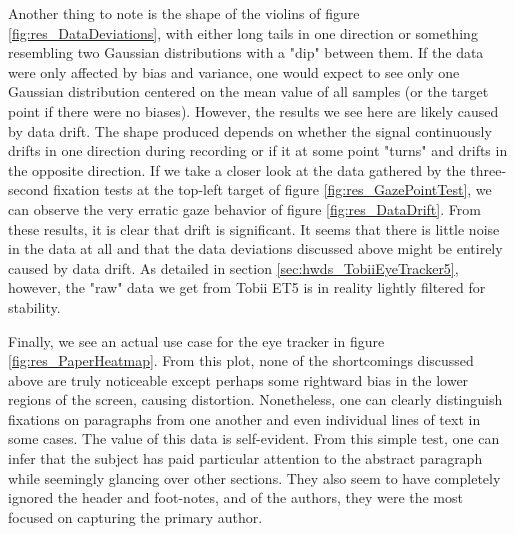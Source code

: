 Another thing to note is the shape of the violins of figure \ref{fig:res_DataDeviations}, with either long tails in one direction or something resembling two Gaussian distributions with a "dip" between them. If the data were only affected by bias and variance, one would expect to see only one Gaussian distribution centered on the mean value of all samples (or the target point if there were no biases). However, the results we see here are likely caused by data drift. The shape produced depends on whether the signal continuously drifts in one direction during recording or if it at some point "turns" and drifts in the opposite direction. If we take a closer look at the data gathered by the three-second fixation tests at the top-left target of figure \ref{fig:res_GazePointTest}, we can observe the very erratic gaze behavior of figure \ref{fig:res_DataDrift}. From these results, it is clear that drift is significant. It seems that there is little noise in the data at all and that the data deviations discussed above might be entirely caused by data drift. As detailed in section \ref{sec:hwds_TobiiEyeTracker5}, however, the "raw" data we get from Tobii ET5 is in reality lightly filtered for stability. 


Finally, we see an actual use case for the eye tracker in figure \ref{fig:res_PaperHeatmap}. From this plot, none of the shortcomings discussed above are truly noticeable except perhaps some rightward bias in the lower regions of the screen, causing distortion. Nonetheless, one can clearly distinguish fixations on paragraphs from one another and even individual lines of text in some cases. The value of this data is self-evident. From this simple test, one can infer that the subject has paid particular attention to the abstract paragraph while seemingly glancing over other sections. They also seem to have completely ignored the header and foot-notes, and of the authors, they were the most focused on capturing the primary author.

